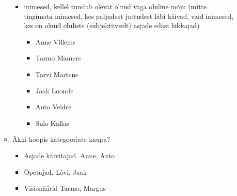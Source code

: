 \documentclass{tufte-book}
\begin{document}
\begin{itemize}
\begin{itemize}
\begin{itemize}
				\item inimesed, kellel tundub olevat olnud väga oluline mõju (mitte tingimata inimesed, kes paljudest juttudest läbi käivad, vaid inimesed, kes on olnud oluliste (subjektiivselt) asjade edasi lükkajad)
				\begin{itemize}
					\item Anne Villems
					\item Tarmo Mamers
					\item Tarvi Martens
					\item Jaak Loonde
					\item Anto Veldre
					\item Sulo Kallas
				\end{itemize}
			\end{itemize}
		\item Äkki hoopis kategooriate kaupa?
		\begin{itemize}
			\item Asjade käivitajad. Anne, Anto
			\item Õpetajad. Lõvi, Jaak
			\item Visionäärid Tarmo, Margus
		\end{itemize}
	\end{itemize}
\end{itemize}





\backmatter


\printindex[ppl]
\printindex
\end{document}
